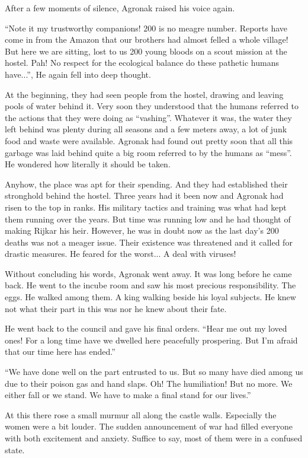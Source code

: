 \documentclass[twoside,11pt,titlepage]{article}
\begin{document}
After a few moments of silence, Agronak raised his voice again.

``Note it my trustworthy companions! 200 is no meagre number. Reports have come in from the Amazon that our brothers had almost felled a whole village! But here we are sitting, lost to us 200 young bloods on a scout mission at the hostel. Pah! No respect for the ecological balance do these pathetic humans have...'', He again fell into deep thought.

At the beginning, they had seen people from the hostel, drawing and leaving pools of water behind it. Very soon they understood that the humans referred to the actions that they were doing as ``vashing''. Whatever it was, the water they left behind was plenty during all seasons and a few meters away, a lot of junk food and waste were available. Agronak had found out pretty soon that all this garbage was laid behind quite a big room referred to by the humans as ``mess''. He wondered how literally it should be taken.

Anyhow, the place was apt for their spending. And they had established their stronghold behind the hostel. Three years had it been now and Agronak had risen to the top in ranks. His military tactics and training was what had kept them running over the years. But time was running low and he had thought of making Rijkar his heir. However, he was in doubt now as the last day's 200 deaths was not a meager issue. Their existence was threatened and it called for drastic measures. He feared for the worst... A deal with viruses!

Without concluding his words, Agronak went away. It was long before he came back. He went to the incube room and saw his most precious responsibility. The eggs. He walked among them. A king walking beside his loyal subjects. He knew not what their part in this was nor he knew about their fate.

He went back to the council and gave his final orders. ``Hear me out my loved ones! For a long time have we dwelled here peacefully prospering. But I'm afraid that our time here has ended.''

``We have done well on the part entrusted to us. But so many have died among us due to their poison gas and hand slaps. Oh! The humiliation! But no more. We either fall or we stand. We have to make a final stand for our lives.''

At this there rose a small murmur all along the castle walls. Especially the women were a bit louder. The sudden announcement of war had filled everyone with both excitement and anxiety. Suffice to say, most of them were in a confused state.
\end{document}
